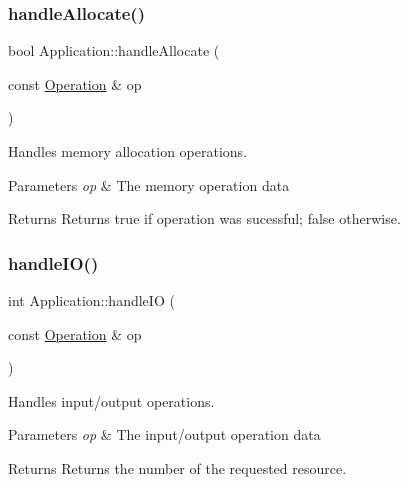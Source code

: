 \hypertarget{class_application_a01f7245a18db9aaa29b6aa70378f5268}{}\label{class_application_a01f7245a18db9aaa29b6aa70378f5268} 
\subsubsection{\texorpdfstring{handle\+Allocate()}{handleAllocate()}}
{\footnotesize\ttfamily bool Application\+::handle\+Allocate (\begin{DoxyParamCaption}\item[{const \hyperlink{struct_operation}{Operation} \&}]{op }\end{DoxyParamCaption})\hspace{0.3cm}{\ttfamily [private]}}



Handles memory allocation operations. 


\begin{DoxyParams}{Parameters}
{\em op} & The memory operation data\\
\hline
\end{DoxyParams}
\begin{DoxyReturn}{Returns}
Returns true if operation was sucessful; false otherwise. 
\end{DoxyReturn}
\hypertarget{class_application_a67ca128f61272b41cd1dfbaabc545414}{}\label{class_application_a67ca128f61272b41cd1dfbaabc545414} 
\subsubsection{\texorpdfstring{handle\+I\+O()}{handleIO()}}
{\footnotesize\ttfamily int Application\+::handle\+IO (\begin{DoxyParamCaption}\item[{const \hyperlink{struct_operation}{Operation} \&}]{op }\end{DoxyParamCaption})\hspace{0.3cm}{\ttfamily [private]}}



Handles input/output operations. 


\begin{DoxyParams}{Parameters}
{\em op} & The input/output operation data\\
\hline
\end{DoxyParams}
\begin{DoxyReturn}{Returns}
Returns the number of the requested resource. 
\end{DoxyReturn}
\hypertarget{class_application_a7e4c67727947c166a9568eff2fa4faa8}{}\label{class_application_a7e4c67727947c166a9568eff2fa4faa8} 
